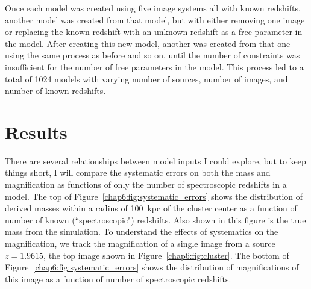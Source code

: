 Once each model was created using five image systems all with known redshifts, another model was created from that model, but with either removing one image or replacing the known redshift with an unknown redshift as a free parameter in the model. After creating this new model, another was created from that one using the same process as before and so on, until the number of constraints was insufficient for the number of free parameters in the model. This process led to a total of 1024 models with varying number of sources, number of images, and number of known redshifts.

\section{Results}

There are several relationships between model inputs I could explore, but to keep things short, I will compare the systematic errors on both the mass and magnification as functions of only the number of spectroscopic redshifts in a model. The top of Figure~\ref{chap6:fig:systematic_errors} shows the distribution of derived masses within a radius of 100~kpc of the cluster center as a function of number of known (``spectroscopic") redshifts. Also shown in this figure is the true mass from the simulation. To understand the effects of systematics on the magnification, we track the magnification of a single image from a source $z=1.9615$, the top image shown in Figure~\ref{chap6:fig:cluster}. The bottom of Figure~\ref{chap6:fig:systematic_errors} shows the distribution of magnifications of this image as a function of number of spectroscopic redshifts.

